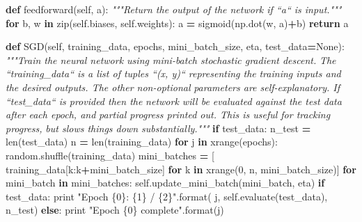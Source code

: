 \documentclass[]{book}
\newenvironment{Shaded}{\begin{snugshade}}{\end{snugshade}}
\newcommand{\KeywordTok}[1]{\textcolor[rgb]{0.13,0.29,0.53}{\textbf{{#1}}}}
\newcommand{\DecValTok}[1]{\textcolor[rgb]{0.00,0.00,0.81}{{#1}}}
\newcommand{\SpecialCharTok}[1]{\textcolor[rgb]{0.00,0.00,0.00}{{#1}}}
\newcommand{\StringTok}[1]{\textcolor[rgb]{0.31,0.60,0.02}{{#1}}}
\newcommand{\CommentTok}[1]{\textcolor[rgb]{0.56,0.35,0.01}{\textit{{#1}}}}
\newcommand{\VariableTok}[1]{\textcolor[rgb]{0.00,0.00,0.00}{{#1}}}
\newcommand{\ControlFlowTok}[1]{\textcolor[rgb]{0.13,0.29,0.53}{\textbf{{#1}}}}
\newcommand{\OperatorTok}[1]{\textcolor[rgb]{0.81,0.36,0.00}{\textbf{{#1}}}}
\newcommand{\BuiltInTok}[1]{{#1}}
\newcommand{\NormalTok}[1]{{#1}}
\begin{document}
\begin{Shaded}
\begin{Highlighting}[]
    \KeywordTok{def} \NormalTok{feedforward(}\VariableTok{self}\NormalTok{, a):}
        \CommentTok{"""Return the output of the network if ``a`` is input."""}
        \ControlFlowTok{for} \NormalTok{b, w }\OperatorTok{in} \BuiltInTok{zip}\NormalTok{(}\VariableTok{self}\NormalTok{.biases, }\VariableTok{self}\NormalTok{.weights):}
            \NormalTok{a }\OperatorTok{=} \NormalTok{sigmoid(np.dot(w, a)}\OperatorTok{+}\NormalTok{b)}
        \ControlFlowTok{return} \NormalTok{a}

    \KeywordTok{def} \NormalTok{SGD(}\VariableTok{self}\NormalTok{, training_data, epochs, mini_batch_size, eta,}
            \NormalTok{test_data}\OperatorTok{=}\VariableTok{None}\NormalTok{):}
        \CommentTok{"""Train the neural network using mini-batch stochastic gradient descent.}
\CommentTok{        The ``training_data`` is a list of tuples ``(x, y)`` representing the }
\CommentTok{        training inputs and the desired outputs.  The other non-optional }
\CommentTok{        parameters are self-explanatory.  If ``test_data`` is provided then the}
\CommentTok{        network will be evaluated against the test data after each epoch, and }
\CommentTok{        partial progress printed out.  This is useful for tracking progress, }
\CommentTok{        but slows things down substantially."""}
        \ControlFlowTok{if} \NormalTok{test_data: n_test }\OperatorTok{=} \BuiltInTok{len}\NormalTok{(test_data)}
        \NormalTok{n }\OperatorTok{=} \BuiltInTok{len}\NormalTok{(training_data)}
        \ControlFlowTok{for} \NormalTok{j }\OperatorTok{in} \BuiltInTok{xrange}\NormalTok{(epochs):}
            \NormalTok{random.shuffle(training_data)}
            \NormalTok{mini_batches }\OperatorTok{=} \NormalTok{[}
                \NormalTok{training_data[k:k}\OperatorTok{+}\NormalTok{mini_batch_size]}
                \ControlFlowTok{for} \NormalTok{k }\OperatorTok{in} \BuiltInTok{xrange}\NormalTok{(}\DecValTok{0}\NormalTok{, n, mini_batch_size)]}
            \ControlFlowTok{for} \NormalTok{mini_batch }\OperatorTok{in} \NormalTok{mini_batches:}
                \VariableTok{self}\NormalTok{.update_mini_batch(mini_batch, eta)}
            \ControlFlowTok{if} \NormalTok{test_data:}
                \BuiltInTok{print} \StringTok{"Epoch }\SpecialCharTok{\{0\}}\StringTok{: }\SpecialCharTok{\{1\}}\StringTok{ / }\SpecialCharTok{\{2\}}\StringTok{"}\NormalTok{.}\BuiltInTok{format}\NormalTok{(}
                    \NormalTok{j, }\VariableTok{self}\NormalTok{.evaluate(test_data), n_test)}
            \ControlFlowTok{else}\NormalTok{:}
                \BuiltInTok{print} \StringTok{"Epoch }\SpecialCharTok{\{0\}}\StringTok{ complete"}\NormalTok{.}\BuiltInTok{format}\NormalTok{(j)}


\end{Highlighting}
\end{Shaded}
\end{document}
